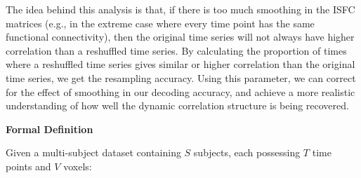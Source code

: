 \documentclass[11pt]{article}
\begin{document}
The idea behind this analysis is that, if there is too much smoothing in the ISFC matrices (e.g., in the extreme case where every time point has the same functional connectivity), then the original time series will not always have higher correlation than a reshuffled time series. By calculating the proportion of times where a reshuffled time series gives similar or higher correlation than the original time series, we get the resampling accuracy.  Using this parameter, we can correct for the effect of smoothing in our decoding accuracy, and achieve a more realistic understanding of how well the dynamic correlation structure is being recovered.

\large{\textbf{Formal Definition}}

\normalsize
Given a multi-subject dataset containing $S$ subjects, each possessing $T$ time points and $V$ voxels:
\end{document}
